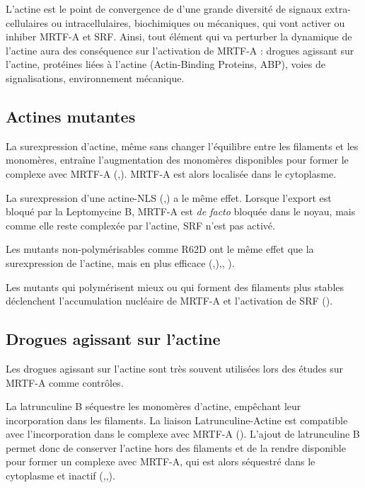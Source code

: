 \documentclass{report}
\begin{document}
L'actine est le point de convergence de d'une grande diversité de signaux extra-cellulaires ou intracellulaires, biochimiques ou mécaniques, qui vont activer ou inhiber MRTF-A et SRF. 
Ainsi, tout élément qui va perturber la dynamique de l'actine aura des conséquence sur l'activation de MRTF-A : drogues agissant sur l'actine, protéines liées à l'actine (Actin-Binding Proteins, ABP), voies de signalisations, environnement mécanique. 


\subsection{Actines mutantes}

La surexpression d'actine, même sans changer l'équilibre entre les filaments et les monomères, entraîne l'augmentation des monomères disponibles pour former le complexe avec MRTF-A (\cite{miralles_actin_2003},\cite{vartiainen_nuclear_2007}). MRTF-A est alors localisée dans le cytoplasme. 

La surexpression d'une actine-NLS (\cite{vartiainen_nuclear_2007},\cite{posern_mutant_2002}) a le même effet. Lorsque l'export est bloqué par la Leptomycine B, MRTF-A est \emph{de facto} bloquée dans le noyau, mais comme elle reste complexée par l'actine, SRF n'est pas activé. 

Les mutants non-polymérisables comme R62D ont le même effet que la surexpression de l'actine, mais en plus efficace (\cite{posern_mutant_2002},\cite{miralles_actin_2003}),\cite{vartiainen_nuclear_2007}, \cite{collard_nuclear_2014}). 

Les mutants qui polymérisent mieux ou qui forment des filaments plus stables déclenchent l'accumulation nucléaire de MRTF-A et l'activation de SRF (\cite{posern_mutant_2004}). 


\subsection{Drogues agissant sur l'actine}

Les drogues agissant sur l'actine sont très souvent utilisées lors des études sur MRTF-A comme contrôles. 

La latrunculine B séquestre les monomères d'actine, empêchant leur incorporation dans les filaments. La liaison Latrunculine-Actine est compatible avec l'incorporation dans le complexe avec MRTF-A (\cite{mouilleron_molecular_2008}). 
L'ajout de latrunculine B permet donc de conserver l'actine hors des filaments et de la rendre disponible pour former un complexe avec MRTF-A, qui est alors séquestré dans le cytoplasme et inactif (\cite{vartiainen_nuclear_2007},\cite{zhao_force_2007},\cite{smith_induction_2013}). 
\end{document}

